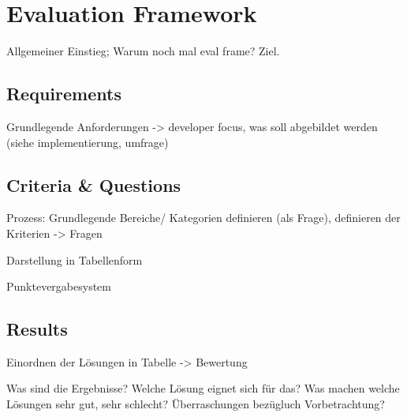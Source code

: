 
\chapter{Evaluation Framework}\label{chapter: framework}

    Allgemeiner Einstieg; Warum noch mal eval frame? Ziel.

	\section{Requirements}
	
	Grundlegende Anforderungen -> developer focus, was soll abgebildet werden (siehe implementierung, umfrage)
	
	\section{Criteria \& Questions}
	
	Prozess: Grundlegende Bereiche/ Kategorien definieren (als Frage), definieren der Kriterien -> Fragen
	
	Darstellung in Tabellenform
	
	Punktevergabesystem
	
	\section{Results}
	
	Einordnen der Lösungen in Tabelle -> Bewertung
	
	Was sind die Ergebnisse? Welche Lösung eignet sich für das? Was machen welche Lösungen sehr gut, sehr schlecht? Überraschungen bezügluch Vorbetrachtung?
	
	